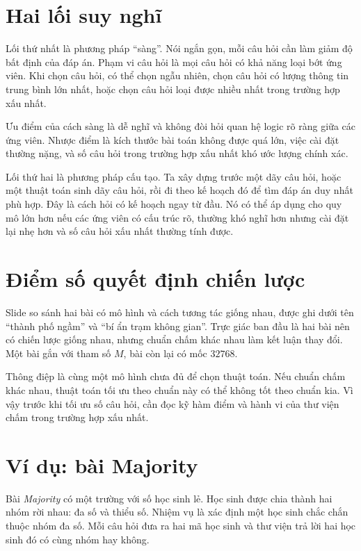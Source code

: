 \documentclass[11pt]{article}
\begin{document}
\section{Hai lối suy nghĩ}

Lối thứ nhất là phương pháp ``sàng''. Nói ngắn gọn, mỗi câu hỏi cần làm giảm
độ bất định của đáp án. Phạm vi câu hỏi là mọi câu hỏi có khả năng loại bớt
ứng viên. Khi chọn câu hỏi, có thể chọn ngẫu nhiên, chọn câu hỏi có lượng
thông tin trung bình lớn nhất, hoặc chọn câu hỏi loại được nhiều nhất trong
trường hợp xấu nhất.

Ưu điểm của cách sàng là dễ nghĩ và không đòi hỏi quan hệ logic rõ ràng giữa
các ứng viên. Nhược điểm là kích thước bài toán không được quá lớn, việc cài
đặt thường nặng, và số câu hỏi trong trường hợp xấu nhất khó ước lượng chính
xác.

Lối thứ hai là phương pháp cấu tạo. Ta xây dựng trước một dãy câu hỏi, hoặc
một thuật toán sinh dãy câu hỏi, rồi đi theo kế hoạch đó để tìm đáp án duy
nhất phù hợp. Đây là cách hỏi có kế hoạch ngay từ đầu. Nó có thể áp dụng cho
quy mô lớn hơn nếu các ứng viên có cấu trúc rõ, thường khó nghĩ hơn nhưng
cài đặt lại nhẹ hơn và số câu hỏi xấu nhất thường tính được.

\section{Điểm số quyết định chiến lược}

Slide so sánh hai bài có mô hình và cách tương tác giống nhau, được ghi dưới
tên ``thành phố ngầm'' và ``bí ẩn trạm không gian''. Trực giác ban đầu là
hai bài nên có chiến lược giống nhau, nhưng chuẩn chấm khác nhau làm kết
luận thay đổi. Một bài gắn với tham số \(M\), bài còn lại có mốc \(32768\).

Thông điệp là cùng một mô hình chưa đủ để chọn thuật toán. Nếu chuẩn chấm
khác nhau, thuật toán tối ưu theo chuẩn này có thể không tốt theo chuẩn kia.
Vì vậy trước khi tối ưu số câu hỏi, cần đọc kỹ hàm điểm và hành vi của thư
viện chấm trong trường hợp xấu nhất.

\section{Ví dụ: bài Majority}

Bài \textit{Majority} có một trường với số học sinh lẻ. Học sinh được chia
thành hai nhóm rời nhau: đa số và thiểu số. Nhiệm vụ là xác định một học sinh
chắc chắn thuộc nhóm đa số. Mỗi câu hỏi đưa ra hai mã học sinh và thư viện
trả lời hai học sinh đó có cùng nhóm hay không.
\end{document}
